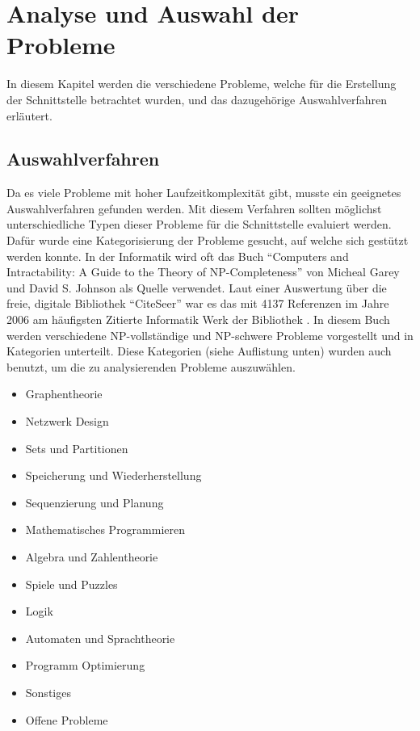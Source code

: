 %
%

\chapter{Analyse und Auswahl der Probleme \resultAssignment{[R1]}}\label{chap.problemauswahl}
In diesem Kapitel werden die verschiedene Probleme, welche für die Erstellung der Schnittstelle betrachtet wurden, und das dazugehörige Auswahlverfahren erläutert.

\section{Auswahlverfahren}\label{cat_theo_inf}
Da es viele Probleme mit hoher Laufzeitkomplexität gibt, musste ein geeignetes Auswahlverfahren gefunden werden. Mit diesem Verfahren sollten möglichst unterschiedliche 
Typen dieser Probleme für die Schnittstelle evaluiert werden. Dafür wurde eine Kategorisierung der Probleme gesucht, auf welche sich gestützt werden konnte. In der Informatik wird oft 
das Buch "`Computers and Intractability: A Guide to the Theory of NP-Completeness"' \cite{garey1979computers} von Micheal Garey und David S. Johnson als Quelle verwendet. Laut einer 
Auswertung über die freie, digitale Bibliothek "`CiteSeer"' war es das mit 4137 Referenzen im Jahre 2006 am häufigsten Zitierte Informatik Werk der Bibliothek \cite{citeseer_algo_buch}. In 
diesem Buch werden verschiedene NP-vollständige und NP-schwere Probleme vorgestellt und in Kategorien unterteilt. Diese Kategorien (siehe Auflistung unten) wurden auch benutzt, um die zu 
analysierenden Probleme auszuwählen.

\begin{itemize}
	\item Graphentheorie
	\item Netzwerk Design
	\item Sets und Partitionen
	\item Speicherung und Wiederherstellung
	\item Sequenzierung und Planung
	\item Mathematisches Programmieren
	\item Algebra und Zahlentheorie
	\item Spiele und Puzzles
	\item Logik
	\item Automaten und Sprachtheorie
	\item Programm Optimierung
	\item Sonstiges
	\item Offene Probleme
\end{itemize}

